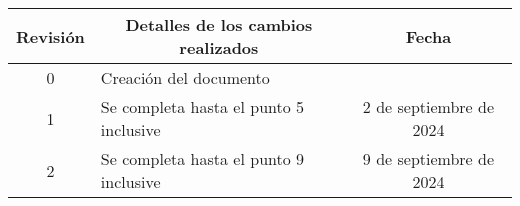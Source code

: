 \begin{table}[ht]
	\label{tab:registro}
	\centering
	\begin{tabularx}{\linewidth}{@{}|c|X|c|@{}}
		\hline
		\rowcolor[HTML]{C0C0C0}
		Revisión 	& \multicolumn{1}{c|}{\cellcolor[HTML]{C0C0C0}Detalles de los cambios realizados} 	& Fecha                       \\ \hline
		0        	& Creación del documento                                                          	& \fechaInicioName            \\ \hline
		1        	& Se completa hasta el punto 5 inclusive                                          	& {2} de {septiembre} de 2024 \\ \hline
		2      		& Se completa hasta el punto 9 inclusive											& {9} de {septiembre} de 2024 \\ \hline

	\end{tabularx}
\end{table}
